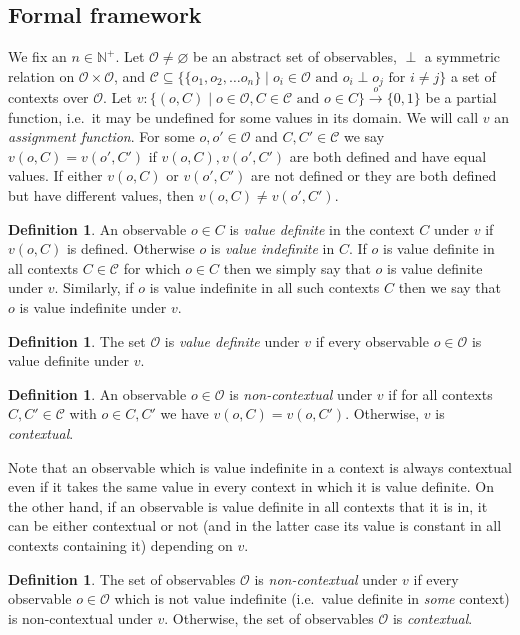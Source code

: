 \documentclass[%
 preprint,
 showpacs,
 showkeys,
 amsmath,
 amssymb,
 aps,
 pra,
 ]{revtex4-1}
\theoremstyle{definition}
\newtheorem{Definition}[Theorem]{Definition}
\begin{document}
\subsection{Formal framework}
We fix an $n\in\mathbb{N}^+$.
Let $\mathcal{O} \neq \varnothing$ be an abstract set of observables, $\perp$ a symmetric relation on $\mathcal{O} \times \mathcal{O}$, and $\mathcal{C}\subseteq \{\{o_1,o_2,\dots o_n\} \mid o_i \in \mathcal{O} \text{ and } o_i\perp o_j \text{ for } i\neq j \}$ a set of contexts over $\mathcal{O}$.
Let $v : \{(o,C) \mid o\in \mathcal{O}, C\in\mathcal{C}\text{ and } o\in C \} \xrightarrow{o} \{0,1\}$ be a partial function, i.e.\ it may be undefined for some values in its domain.
We will call $v$ an \emph{assignment function}.
For some $o,o'\in \mathcal{O}$ and $C,C'\in\mathcal{C}$ we say $v(o,C)=v(o',C')$ if $v(o,C),v(o',C')$ are both defined and have equal values.
If either $v(o,C)$ or $v(o',C')$ are not defined or they are both defined but have different values, then $v(o,C)\neq v(o',C')$.\\

\begin{Definition}
	An observable $o\in C$ is \emph{value definite} in the context $C$ under $v$ if $v(o,C)$ is defined.
	Otherwise $o$ is \emph{value indefinite} in $C$.
	If $o$ is value definite in all contexts $C\in \mathcal{C}$ for which $o\in C$ then we simply say that $o$ is value definite under $v$.
	Similarly, if $o$ is value indefinite in all such contexts $C$ then we say that $o$ is value indefinite under $v$.\\
\end{Definition}
\begin{Definition}
	The set $\mathcal{O}$ is \emph{value definite} under $v$ if every observable $o\in\mathcal{O}$ is value definite under $v$.\\
\end{Definition}

\begin{Definition}
 	An observable $o\in \mathcal{O}$ is \emph{non-contextual} under $v$ if for all contexts $C,C' \in \mathcal{C}$ with $o\in C,C'$ we have $v(o,C)=v(o,C')$. Otherwise, $v$ is \emph{contextual}.
\end{Definition}
	Note that an observable which is value indefinite in a context is always contextual even if it takes the same value in every context in which it is value definite.
	On the other hand, if an observable is value definite in all contexts that it is in, it can be either contextual or not (and in the latter case its value is constant in all contexts containing it) depending on $v$.\\
\begin{Definition}
	The set of observables $\mathcal{O}$ is \emph{non-contextual} under $v$ if every observable $o\in\mathcal{O}$ which is not value indefinite (i.e.\ value definite in \emph{some} context) is non-contextual under $v$.
	Otherwise, the set of observables $\mathcal{O}$ is \emph{contextual}.\\
\end{Definition}
\end{document}
